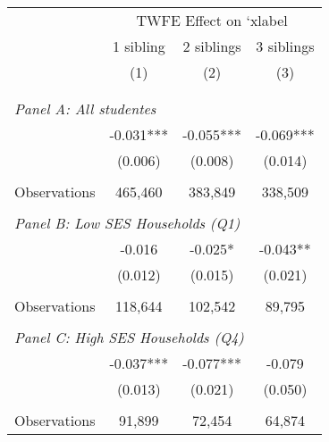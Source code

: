 \makeatletter
{}
{
\makeatother
\begin{tabular}{lccc}
\toprule
\cmidrule(lr){2-4}
& \multicolumn{3}{c}{TWFE Effect on `xlabel} \\
\cmidrule(lr){2-4}
& 1 sibling & 2 siblings & 3 siblings  \\
\cmidrule(lr){2-2} \cmidrule(lr){3-3} \cmidrule(lr){4-4}
& (1) & (2) & (3)\\
\bottomrule
&  &  &  \\
&  &  &   \\
\multicolumn{4}{l}{\textit{Panel A: All studentes}} \\
\hspace{3mm}        &      -0.031***&      -0.055***&      -0.069***\\
                    &     (0.006)   &     (0.008)   &     (0.014)   \\
                    &               &               &               \\
\hspace{3mm}Observations&     465,460   &     383,849   &     338,509   \\
 
&  &  &   \\
\multicolumn{4}{l}{\textit{Panel B: Low SES Households (Q1)}} \\
\hspace{3mm}        &      -0.016   &      -0.025*  &      -0.043** \\
                    &     (0.012)   &     (0.015)   &     (0.021)   \\
                    &               &               &               \\
\hspace{3mm}Observations&     118,644   &     102,542   &      89,795   \\
 
&  &  &   \\
\multicolumn{4}{l}{\textit{Panel C: High SES Households (Q4)}} \\
\hspace{3mm}        &      -0.037***&      -0.077***&      -0.079   \\
                    &     (0.013)   &     (0.021)   &     (0.050)   \\
                    &               &               &               \\
\hspace{3mm}Observations&      91,899   &      72,454   &      64,874   \\
 

\end{tabular}}
